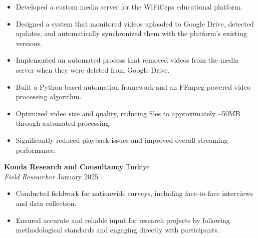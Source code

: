 \documentclass[10pt,a4paper]{extarticle}
\begin{document}
\begin{itemize}[leftmargin=*,noitemsep,topsep=0pt]
    \item Developed a custom media server for the WiFiCeps educational platform.
    \item Designed a system that monitored videos uploaded to Google Drive, detected updates, and automatically synchronized them with the platform's existing versions.
    \item Implemented an automated process that removed videos from the media server when they were deleted from Google Drive.
    \item Built a Python-based automation framework and an FFmpeg-powered video processing algorithm.
    \item Optimized video size and quality, reducing files to approximately \textasciitilde50MB through automated processing.
    \item Significantly reduced playback issues and improved overall streaming performance.
\end{itemize}
\textbf{Konda Research and Consultancy} \hfill Türkiye\\
\textit{Field Researcher} \hfill January 2025
\begin{itemize}[leftmargin=*,noitemsep,topsep=0pt]
    \item Conducted fieldwork for nationwide surveys, including face-to-face interviews and data collection.
    \item Ensured accurate and reliable input for research projects by following methodological standards and engaging directly with participants.
\end{itemize}
\end{document}
